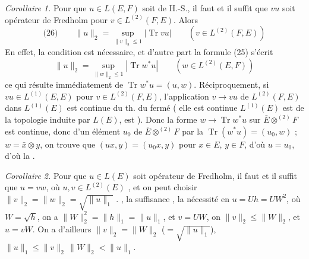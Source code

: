 \documentclass[11pt,a4paper]{article}
\begin{document}
\emph{Corollaire 1.} Pour que $u \in L(E,F)$ soit \struck{\ill{}} de H.-S., il faut et il suffit que \struck{\ill{}} $vu$ soit opérateur de Fredholm pour  $v \in L^{(2)}(F,E)$. Alors 
\[
  \text{(26)}\qquad \|u\|_2 = \sup_{\|v\|_2 \leq 1} |\operatorname{Tr} vu| \qquad (v \in L^{(2)}(F,E))
\]
En effet,   la condition est nécessaire, et d'autre part la formule (25) s'écrit
\[
  \|u\|_2 = \sup_{\|w\|_2 \leq 1} |\operatorname{Tr} w^{*}u| \qquad (w \in L^{(2)}(E,F))
\]
ce qui résulte immédiatement de $\operatorname{Tr} w^{*}u = (u, w)$. Réciproquement, si $vu \in L^{(1)}(E,E)$ pour  $v \in L^{(2)}(F,E)$, l'application $v \to vu$ de $L^{(2)}(F,E)$ dans $L^{(1)}(E)$  est continue  du th. du  fermé ( elle est continue  $L^{(1)}(E)$ est  de la topologie induite par $L(E)$,  est \ill{} \ill{} \ill{}). Donc la forme  \struck{\ill{}} $w \to \operatorname{Tr} w^{*}u$  sur $\bar{E} \otimes^{(2)} F$ est continue, donc  d'un élément $u_0$ de $\bar{E} \otimes^{(2)} F$ par la  \struck{\ill{}} $\operatorname{Tr}(w^{*}u) = (u_0, w)$ ;  $w = \bar{x} \otimes y$, on trouve que $(ux, y) = (u_0 x, y)$ pour  $x \in E$, $y \in F$, d'où $u = u_0$, d'où la . 

\emph{Corollaire 2.} Pour que $u \in L(E)$ soit opérateur de Fredholm, il faut et il suffit que $u = vw$, où $u, v \in L^{(2)}(E)$ , et on peut choisir $\|v\|_2 = \|w\|_2 = \sqrt{\|u\|_1}$ .  , la suffisance \struck{\ill{}} , la nécessité   en  $u = Uh = UW^{2}$, où $W = \sqrt{h}$, on a  $\|W\|_2^{2} = \|h\|_1 = \|u\|_1$, et  $v = UW$, on  $\|v\|_2 \leq \|W\|_2$, et  $u = vW$. On a d'ailleurs $\|v\|_2 = \|W\|_2$ ($= \sqrt{\|u\|_1}$),  \struck{\ill{}}   $\|u\|_1 \leq \|v\|_2\, \|W\|_2 < \|u\|_1$. 
\end{document}
